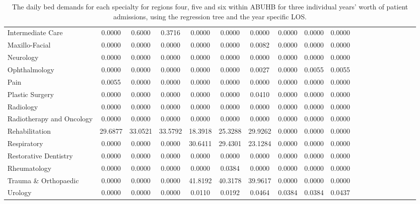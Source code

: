 \documentclass[thesis.tex]{subfiles}
\begin{document}
\begin{landscape}
\begin{table}[h!]
{\begin{tabular}{lcccccccccccccccccc}
Intermediate Care&	0.0000&	0.6000&	0.3716&	0.0000&	0.0000&	0.0000&	0.0000&	0.0000&	0.0000\\
Maxillo-Facial&	0.0000&	0.0000&	0.0000&	0.0000&	0.0000&	0.0082&	0.0000&	0.0000&	0.0000\\
Neurology&	0.0000&	0.0000&	0.0000&	0.0000&	0.0000&	0.0000&	0.0000&	0.0000&	0.0000\\
Ophthalmology&	0.0000&	0.0000&	0.0000&	0.0000&	0.0000&	0.0027&	0.0000&	0.0055&	0.0055\\
Pain&	0.0055&	0.0000&	0.0000&	0.0000&	0.0000&	0.0000&	0.0000&	0.0000&	0.0000\\
Plastic Surgery&	0.0000&	0.0000&	0.0000&	0.0000&	0.0000&	0.0410&	0.0000&	0.0000&	0.0000\\
Radiology&	0.0000&	0.0000&	0.0000&	0.0000&	0.0000&	0.0000&	0.0000&	0.0000&	0.0000\\
Radiotherapy and Oncology&	0.0000&	0.0000&	0.0000&	0.0000&	0.0000&	0.0000&	0.0000&	0.0000&	0.0000\\
Rehabilitation&	29.6877&	33.0521&	33.5792&	18.3918&	25.3288&	29.9262&	0.0000&	0.0000&	0.0000\\
Respiratory&	0.0000&	0.0000&	0.0000&	30.6411&	29.4301&	23.1284&	0.0000&	0.0000&	0.0000\\
Restorative Dentistry&	0.0000&	0.0000&	0.0000&	0.0000&	0.0000&	0.0000&	0.0000&	0.0000&	0.0000\\
Rheumatology&	0.0000&	0.0000&	0.0000&	0.0000&	0.0384&	0.0000&	0.0000&	0.0000&	0.0000\\
Trauma \& Orthopaedic&	0.0000&	0.0000&	0.0000&	41.8192&	40.3178&	39.9617&	0.0000&	0.0000&	0.0000\\
Urology&	0.0000&	0.0000&	0.0000&	0.0110&	0.0192&	0.0464&	0.0384&	0.0384&	0.0437\\

\bottomrule
\end{tabular}} 
\caption{The daily bed demands for each specialty for regions four, five and six within ABUHB for three individual years’ worth of patient admissions, using the regression tree and the year specific LOS.}
    \label{apptab:LinkedDemands5b}
\end{table}
\end{landscape}
\end{document}
